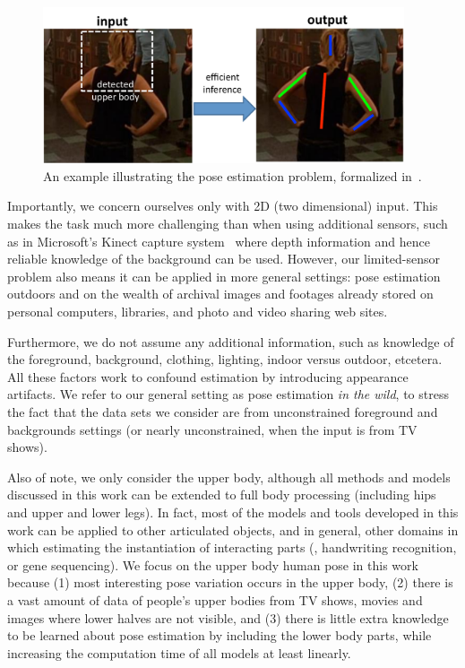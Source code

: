 \begin{figure}[tb]
\begin{center}
\includegraphics[width=0.95\textwidth]{figs/problem-statement.pdf}
\caption[Statement of problem.]{An example illustrating the pose estimation 
problem, formalized in~.}
\label{fig:pose-problem}
\end{center}
\end{figure}

Importantly, we concern ourselves only with 2D (two dimensional) input.  This 
makes the task much more challenging than when using additional sensors, such 
as in Microsoft's Kinect capture system~\citep{kinect} where depth information 
and hence reliable knowledge of the background can be used.  However, our 
limited-sensor problem also means it can be applied in more general settings: 
pose estimation outdoors and on the wealth of archival images and footages 
already stored on personal computers, libraries, and photo and video sharing 
web sites.  

Furthermore, we do not assume any additional information, such as knowledge of 
the foreground, background, clothing, lighting, indoor versus outdoor, 
etcetera.  All these factors work to confound estimation by introducing 
appearance artifacts.  We refer to our general setting as pose estimation {\em 
in the wild}, to stress the fact that the data sets we consider are from 
unconstrained foreground and backgrounds settings (or nearly unconstrained, 
when the input is from TV shows).

Also of note, we only consider the upper body, although all methods and models 
discussed in this work can be extended to full body processing (\ie including 
hips and upper and lower legs).  In fact, most of the models and tools 
developed in this work can be applied to other articulated objects, and in 
general, other domains in which estimating the instantiation of interacting 
parts (\eg, handwriting recognition, or gene sequencing). We focus on the upper 
body human pose in this work because (1) most interesting pose variation occurs 
in the upper body, (2) there is a vast amount of data of people's upper bodies 
from TV shows, movies and images where lower halves are not visible, and (3) 
there is little extra knowledge to be learned about pose estimation by 
including the lower body parts, while increasing the computation time of all 
models at least linearly.  


